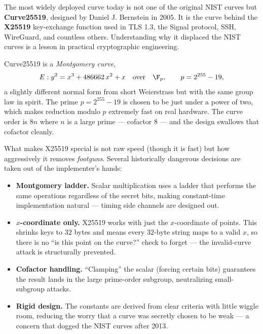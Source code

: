 The most widely deployed curve today is not one of the original NIST curves but
\textbf{Curve25519}, designed by Daniel J. Bernstein in 2005. It is the curve behind the
\textbf{X25519} key-exchange function used in TLS 1.3, the Signal protocol, SSH, WireGuard,
and countless others. Understanding why it displaced the NIST curves is a lesson in
practical cryptographic engineering.

Curve25519 is a \emph{Montgomery curve},
\[
E : y^2 = x^3 + 486662\,x^2 + x \quad \text{over}\quad \F_p, \qquad p = 2^{255} - 19,
\]
a slightly different normal form from short Weierstrass but with the same group law in
spirit. The prime $p = 2^{255}-19$ is chosen to be just under a power of two, which makes
reduction modulo $p$ extremely fast on real hardware. The curve order is $8n$ where $n$
is a large prime --- cofactor $8$ --- and the design swallows that cofactor cleanly.

\begin{aestheticbox}
What makes X25519 special is not raw speed (though it is fast) but how aggressively it
removes \emph{footguns}. Several historically dangerous decisions are taken out of the
implementer's hands:
\begin{itemize}
  \item \textbf{Montgomery ladder.} Scalar multiplication uses a ladder that performs the
        same operations regardless of the secret bits, making constant-time
        implementation natural --- timing side channels are designed out.
  \item \textbf{$x$-coordinate only.} X25519 works with just the $x$-coordinate of points.
        This shrinks keys to $32$ bytes and means every $32$-byte string maps to a valid
        $x$, so there is no ``is this point on the curve?'' check to forget --- the
        invalid-curve attack is structurally prevented.
  \item \textbf{Cofactor handling.} ``Clamping'' the scalar (forcing certain bits)
        guarantees the result lands in the large prime-order subgroup, neutralizing
        small-subgroup attacks.
  \item \textbf{Rigid design.} The constants are derived from clear criteria with little
        wiggle room, reducing the worry that a curve was secretly chosen to be weak ---
        a concern that dogged the NIST curves after 2013.
\end{itemize}
\end{aestheticbox}

